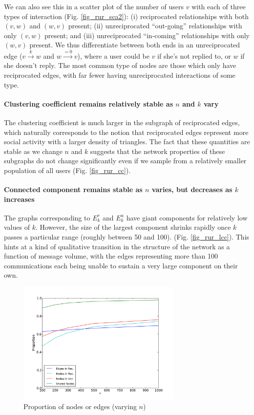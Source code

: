 \documentclass[conference]{IEEEtran}
\begin{document}
We can also see this in  a scatter plot of the
number of users $v$ with each of three types of interaction (Fig. \ref{fig_rur_sca2}):
(i) reciprocated relationships with both $(v,w)$ and $(w,v)$ present;
(ii) unreciprocated ``out-going'' relationships with only $(v,w)$ present;
and 
(iii) unreciprocated ``in-coming'' relationships with only $(w,v)$ present.
We thus differentiate between both ends in an
unreciprocated edge ($v \xrightarrow{k} w$ and $w \xrightarrow{=0} v$),
where a user could be $v$ if she's not replied to, or $w$ if she
doesn't reply.  The most common type of nodes are those which only
have reciprocated edges, with far fewer having unreciprocated
interactions of some type.

\paragraph*{Clustering coefficient remains relatively stable as $n$ and $k$ vary}
The clustering coefficient is much larger in the subgraph of reciprocated
edges, which naturally corresponds to the notion that reciprocated 
edges represent more social activity with a larger density of triangles.
The fact that these quantities are stable as we change $n$ and $k$ suggests
that the network properties of these subgraphs do not change significantly even if we sample from a relatively smaller population of all users (Fig. \ref{fig_rur_cc}).

\paragraph*{Connected component remains stable as $n$ varies, but decreases as $k$ increases} 
The graphs corresponding to $E_k^r$ and $E_k^u$ have giant components
for relatively low values of $k$.
However, the size of the largest component shrinks rapidly once 
$k$ passes a particular range (roughly between 50 and 100).
(Fig. \ref{fig_rur_lcc}).
This hints at a kind of qualitative transition in the structure of the
network as a function of message volume, with the edges representing 
more than 100 communications each being unable to sustain a very large
component on their own.

\begin{figure}[!t]
\centering
\includegraphics[width=3.2in]{proportion_edgesnodes_n}                
\caption{Proportion of nodes or edges (varying $n$)}
\label{fig_rur_propn}
\end{figure}
\end{document}
